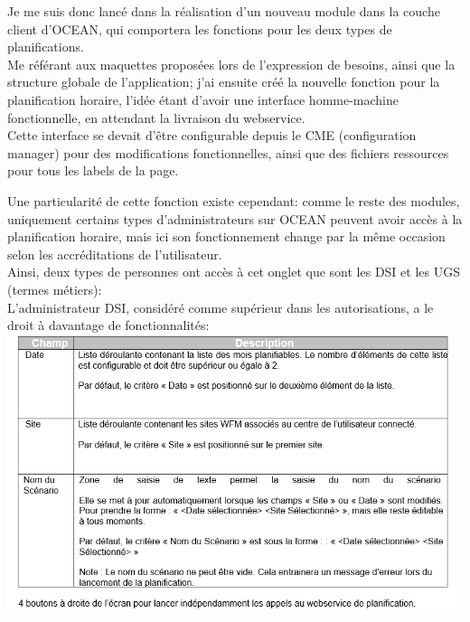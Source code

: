 \documentclass{rapport}
\begin{document}
\begin{minipage}{0.35\textwidth}
\end{minipage}
\begin{minipage}{0.55\textwidth}
Je me suis donc lancé dans la réalisation d'un nouveau module dans la couche client d'OCEAN, qui comportera les fonctions pour les deux types de planifications.\\
Me référant aux maquettes proposées lors de l'expression de besoins, ainsi que la structure globale de l'application; j'ai ensuite créé la nouvelle fonction pour la planification horaire, l'idée étant d'avoir une interface homme-machine fonctionnelle, en attendant la livraison du webservice.\\

Cette interface se devait d'être configurable depuis le CME (configuration manager) pour des modifications fonctionnelles, ainsi que des fichiers ressources pour tous les labels de la page.
\end{minipage}
\vspace{5mm} %

Une particularité de cette fonction existe cependant: comme le reste des modules, uniquement certains types d'administrateurs sur OCEAN peuvent avoir accès à la planification horaire, mais ici son fonctionnement change par la même occasion selon les accréditations de l'utilisateur.\\
Ainsi, deux types de personnes ont accès à cet onglet que sont les DSI et les UGS (termes métiers):\\

L'administrateur DSI, considéré comme supérieur dans les autorisations, a le droit à davantage de fonctionnalités:\\
\includegraphics[width=.95\textwidth]{fig/fig18_PlanoHDSIFonct.png}
\end{document}
